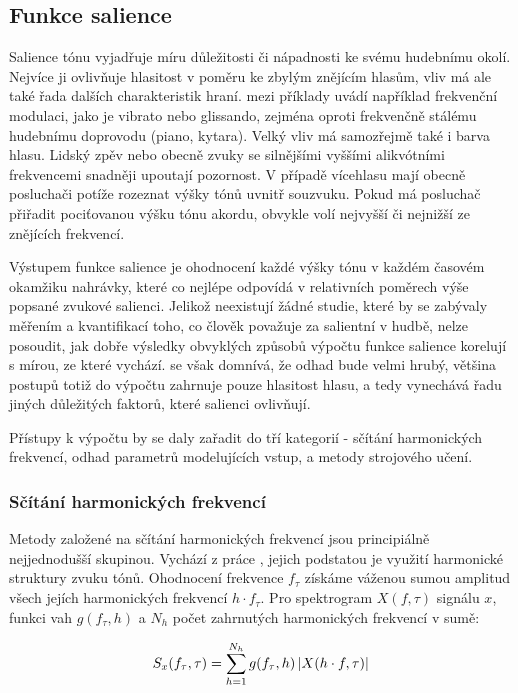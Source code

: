 \subsection{Funkce salience}

Salience tónu vyjadřuje míru důležitosti či nápadnosti ke svému hudebnímu okolí. Nejvíce ji ovlivňuje hlasitost v poměru ke zbylým znějícím hlasům, vliv má ale také řada dalších charakteristik hraní. \cite{Dressler2016} mezi příklady uvádí například frekvenční modulaci, jako je vibrato nebo glissando, zejména oproti frekvenčně stálému hudebnímu doprovodu (piano, kytara). Velký vliv má samozřejmě také i barva hlasu. Lidský zpěv nebo obecně zvuky se silnějšími vyššími alikvótními frekvencemi snadněji upoutají pozornost. V případě vícehlasu mají obecně posluchači potíže rozeznat výšky tónů uvnitř souzvuku. Pokud má posluchač přiřadit pociťovanou výšku tónu akordu, obvykle volí nejvyšší či nejnižší ze znějících frekvencí.

Výstupem funkce salience je ohodnocení každé výšky tónu v každém časovém okamžiku nahrávky, které co nejlépe odpovídá v relativních poměrech výše popsané zvukové salienci. Jelikož neexistují žádné studie, které by se zabývaly měřením a kvantifikací toho, co člověk považuje za salientní v hudbě, nelze posoudit, jak dobře výsledky obvyklých způsobů výpočtu funkce salience korelují s mírou, ze které vychází. \cite{Bittner2018a} se však domnívá, že odhad bude velmi hrubý, většina postupů totiž do výpočtu zahrnuje pouze hlasitost hlasu, a tedy vynechává řadu jiných důležitých faktorů, které salienci ovlivňují.

Přístupy k výpočtu by se daly zařadit do tří kategorií - sčítání harmonických frekvencí, odhad parametrů modelujících vstup, a metody strojového učení. 

\subsubsection{Sčítání harmonických frekvencí}

Metody založené na sčítání harmonických frekvencí jsou principiálně nejjednodušší skupinou. Vychází z práce \cite{Hermes1988}, jejich podstatou je využití harmonické struktury zvuku tónů. Ohodnocení frekvence $f_\tau$ získáme váženou sumou amplitud všech jejích harmonických frekvencí $h \cdot f_\tau$. Pro spektrogram $X(f, \tau)$ signálu $x$, funkci vah $g(f_\tau, h)$ a $N_h$ počet zahrnutých harmonických frekvencí v sumě:

    $$S_x(f_\tau, \tau) = \sum_{h=1}^{N_h}{g(f_\tau, h)\left|{X(h \cdot f, \tau)}\right|}$$


